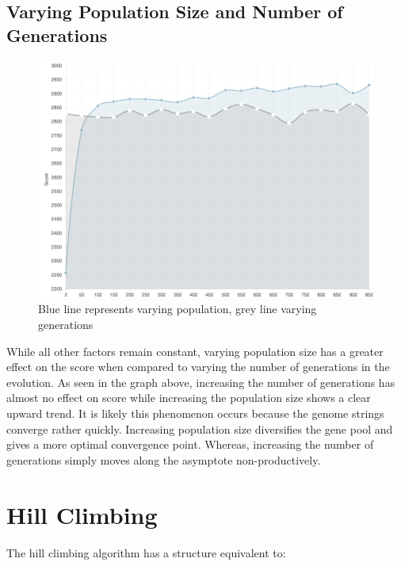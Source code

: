 \documentclass[12pt]{article}
\begin{document}
\subsection{Varying Population Size and Number of Generations}
\label{vpg}
\begin{figure}[h!]
    \centering
    \includegraphics[scale=0.5]{figures/gen_pop_compare}
    \caption{Blue line represents varying population, grey line varying generations}
\end{figure}

While all other factors remain constant,
varying population size has a greater effect on the score when compared to varying the number
of generations in the evolution. As seen in the graph above, increasing the number
of generations has almost no effect on score while increasing the population
size shows a clear upward trend.  It is likely this phenomenon occurs because the genome
strings converge rather quickly.  Increasing population size diversifies
the gene pool and gives a more optimal convergence point. Whereas, increasing
the number of generations simply moves along the asymptote non-productively.

\section{Hill Climbing}

The hill climbing algorithm has a structure equivalent to: \\

\begin{algorithm}[H]
\end{algorithm}
\end{document}
